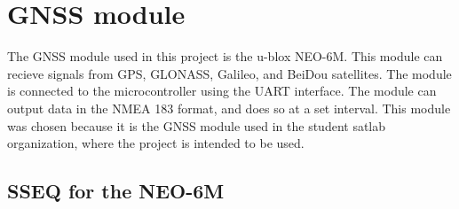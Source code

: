 \section{GNSS module}\label{sec:gnss-module}
The GNSS module used in this project is the u-blox NEO-6M.
This module can recieve signals from GPS, GLONASS, Galileo, and BeiDou satellites.
The module is connected to the microcontroller using the UART interface.
The module can output data in the NMEA 183 format, and does so at a set interval.
This module was chosen because it is the GNSS module used in the student satlab organization, where the project is intended to be used.

\subsection{SSEQ for the NEO-6M}
